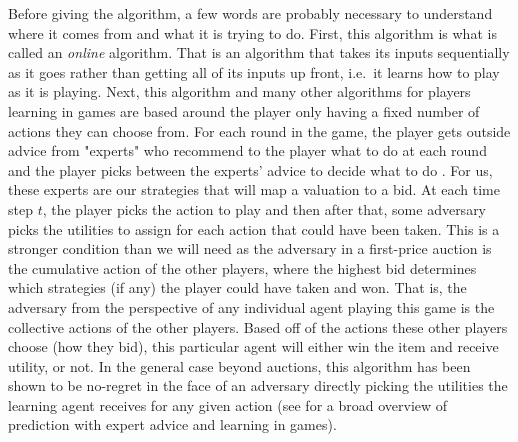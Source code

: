\documentclass[12pt,twoside]{reedthesis}
\begin{document}
Before giving the algorithm, a few words are probably necessary to understand where it comes from and what it is trying to do. First, this algorithm is what is called an {\em online} algorithm. That is an algorithm that takes its inputs sequentially as it goes rather than getting all of its inputs up front, i.e.~it learns how to play as it is playing. Next, this algorithm and many other algorithms for players learning in games are based around the player only having a fixed number of actions they can choose from. For each round in the game, the player gets outside advice from "experts" who recommend to the player what to do at each round and the player picks between the experts' advice to decide what to do \citep{Roughgarden2016}. For us, these experts are our strategies that will map a valuation to a bid. At each time step $t$, the player picks the action to play and then after that, some adversary picks the utilities to assign for each action that could have been taken. This is a stronger condition than we will need as the adversary in a first-price auction is the cumulative action of the other players, where the highest bid determines which strategies (if any) the player could have taken and won. That is, the adversary from the perspective of any individual agent playing this game is the collective actions of the other players. Based off of the actions these other players choose (how they bid), this particular agent will either win the item and receive utility, or not. In the general case beyond auctions, this algorithm has been shown to be no-regret in the face of an adversary directly picking the utilities the learning agent receives for any given action (see \cite{Lugosi2006} for a broad overview of prediction with expert advice and learning in games).\\
\end{document}
